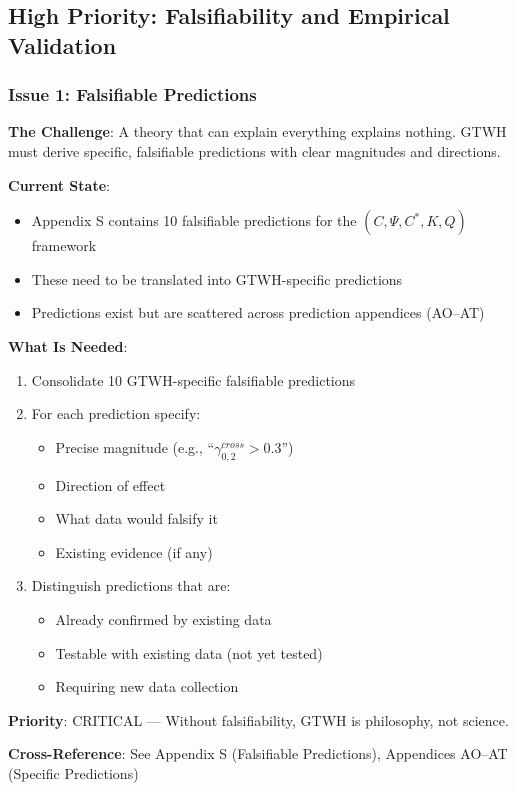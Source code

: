 \subsection{High Priority: Falsifiability and Empirical Validation}

\subsubsection{Issue 1: Falsifiable Predictions}

\begin{tcolorbox}[colback=red!5!white, colframe=red!75!black, title=Status: Partially Addressed]
\textbf{The Challenge}: A theory that can explain everything explains nothing. 
GTWH must derive specific, falsifiable predictions with clear magnitudes and 
directions.

\textbf{Current State}: 
\begin{itemize}[nosep]
\item Appendix S contains 10 falsifiable predictions for the $(C, \Psi, C^*, K, Q)$ framework
\item These need to be translated into GTWH-specific predictions
\item Predictions exist but are scattered across prediction appendices (AO--AT)
\end{itemize}

\textbf{What Is Needed}:
\begin{enumerate}
\item Consolidate 10 GTWH-specific falsifiable predictions
\item For each prediction specify:
    \begin{itemize}[nosep]
    \item Precise magnitude (e.g., ``$\gamma^{cross}_{0,2} > 0.3$'')
    \item Direction of effect
    \item What data would falsify it
    \item Existing evidence (if any)
    \end{itemize}
\item Distinguish predictions that are:
    \begin{itemize}[nosep]
    \item Already confirmed by existing data
    \item Testable with existing data (not yet tested)
    \item Requiring new data collection
    \end{itemize}
\end{enumerate}

\textbf{Priority}: \colorbox{red!20}{CRITICAL} --- Without falsifiability, GTWH is philosophy, not science.

\textbf{Cross-Reference}: See Appendix S (Falsifiable Predictions), Appendices AO--AT (Specific Predictions)
\end{tcolorbox}

